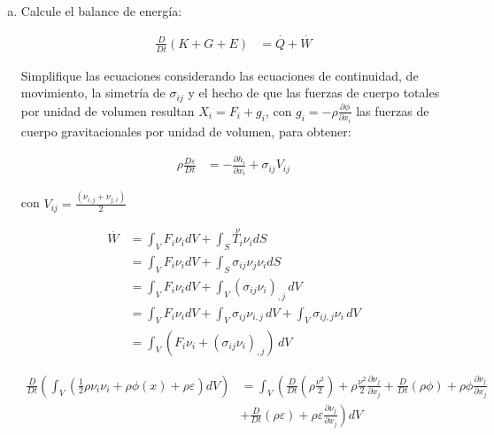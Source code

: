 \documentclass[a4paper,10pt,twoside,final,spanish]{article}
\begin{document}
\begin{enumerate}[a.]
\item Calcule el balance de energía:

\begin{align*}
\frac{D}{Dt}(K+G+E) &= \stackrel{\cdot}{Q}+\stackrel{\cdot}{W}
\end{align*}

Simplifique las ecuaciones considerando las ecuaciones de continuidad, de movimiento, la simetría de $\sigma_{ij}$ y el hecho de que las fuerzas de cuerpo totales por 
unidad de volumen resultan $X_{i}=F_{i}+g_{i}$, con $\displaystyle g_{i}=-\rho\frac{\partial\phi}{\partial x_{i}}$ las fuerzas de cuerpo gravitacionales por unidad de volumen, para obtener:

\begin{align*}
\rho\frac{D\varepsilon}{Dt} &= -\frac{\partial h_{i}}{\partial x_{i}}+\sigma_{ij}V_{ij}
\end{align*}

con $\displaystyle V_{ij}=\frac{(\nu_{i,j}+\nu_{j,i})}{2}$

\begin{tcolorbox}[colback=gray!10!white,colframe=black!0!white]

\begin{align*}
\stackrel{\cdot}{W} &= \int_{V}F_{i}\nu_{i}dV+\int_{S}\stackrel{\nu}{T_{i}}\nu_{i}dS \\
&= \int_{V}F_{i}\nu_{i}dV+\int_{S}\sigma_{ij}\nu_{j}\nu_{i}dS \\
&= \int_{V}F_{i}\nu_{i}dV+\int_{V}(\sigma_{ij}\nu_{i})_{,j}\,dV \\
&= \int_{V}F_{i}\nu_{i}dV+\int_{V}\sigma_{ij}\nu_{i,j}\,dV+\int_{V}\sigma_{ij,j}\nu_{i}\,dV \\
&= \int_{V}(F_{i}\nu_{i}+(\sigma_{ij}\nu_{i})_{,j})\,dV
\end{align*}

\begin{align*}
\frac{D}{Dt}\left(\int_{V}\left(\frac{1}{2}\rho\nu_{i}\nu_{i}
+\rho\phi(x)+\rho\varepsilon\right)dV\right)
&= \int_{V}\left(\frac{D}{Dt}\left(\rho\frac{\nu^{2}}{2}\right)
+\rho\frac{\nu^{2}}{2}\frac{\partial\nu_{j}}{\partial x_{j}}
+\frac{D}{Dt}(\rho\phi)+\rho\phi\frac{\partial\nu_{j}}{\partial x_{j}}\right. \\
&+ \left.\frac{D}{Dt}(\rho\varepsilon)+\rho\varepsilon\frac{\partial\nu_{j}}{\partial x_{j}}
\right)dV \\
\end{align*}


\end{tcolorbox}
\end{enumerate}
\end{document}
